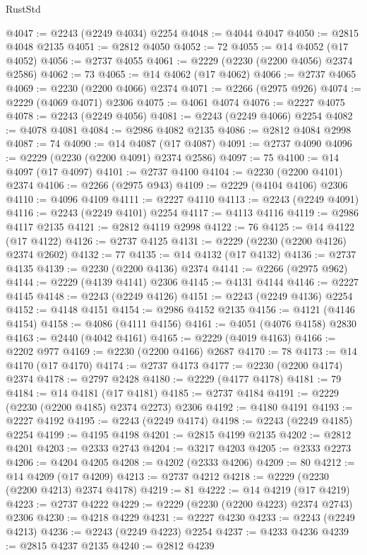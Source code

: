 \begin{lexlean}{RustStd}
\begin{coremodule}
@4047 := @2243 (@2249 @4034) @2254
@4048 := @4044 @4047
@4050 := @2815 @4048 @2135
@4051 := @2812 @4050
@4052 := 72
@4055 := @14 @4052 (@17 @4052)
@4056 := @2737 @4055
@4061 := @2229 (@2230 (@2200 @4056) @2374 @2586)
@4062 := 73
@4065 := @14 @4062 (@17 @4062)
@4066 := @2737 @4065
@4069 := @2230 (@2200 @4066) @2374
@4071 := @2266 (@2975 @926)
@4074 := @2229 (@4069 @4071) @2306
@4075 := @4061 @4074
@4076 := @2227 @4075
@4078 := @2243 (@2249 @4056)
@4081 := @2243 (@2249 @4066) @2254
@4082 := @4078 @4081
@4084 := @2986 @4082 @2135
@4086 := @2812 @4084 @2998
@4087 := 74
@4090 := @14 @4087 (@17 @4087)
@4091 := @2737 @4090
@4096 := @2229 (@2230 (@2200 @4091) @2374 @2586)
@4097 := 75
@4100 := @14 @4097 (@17 @4097)
@4101 := @2737 @4100
@4104 := @2230 (@2200 @4101) @2374
@4106 := @2266 (@2975 @943)
@4109 := @2229 (@4104 @4106) @2306
@4110 := @4096 @4109
@4111 := @2227 @4110
@4113 := @2243 (@2249 @4091)
@4116 := @2243 (@2249 @4101) @2254
@4117 := @4113 @4116
@4119 := @2986 @4117 @2135
@4121 := @2812 @4119 @2998
@4122 := 76
@4125 := @14 @4122 (@17 @4122)
@4126 := @2737 @4125
@4131 := @2229 (@2230 (@2200 @4126) @2374 @2602)
@4132 := 77
@4135 := @14 @4132 (@17 @4132)
@4136 := @2737 @4135
@4139 := @2230 (@2200 @4136) @2374
@4141 := @2266 (@2975 @962)
@4144 := @2229 (@4139 @4141) @2306
@4145 := @4131 @4144
@4146 := @2227 @4145
@4148 := @2243 (@2249 @4126)
@4151 := @2243 (@2249 @4136) @2254
@4152 := @4148 @4151
@4154 := @2986 @4152 @2135
@4156 := @4121 (@4146 @4154)
@4158 := @4086 (@4111 @4156)
@4161 := @4051 (@4076 @4158) @2830
@4163 := @2440 (@4042 @4161)
@4165 := @2229 (@4019 @4163)
@4166 := @2202 @977
@4169 := @2230 (@2200 @4166) @2687
@4170 := 78
@4173 := @14 @4170 (@17 @4170)
@4174 := @2737 @4173
@4177 := @2230 (@2200 @4174) @2374
@4178 := @2797 @2428
@4180 := @2229 (@4177 @4178)
@4181 := 79
@4184 := @14 @4181 (@17 @4181)
@4185 := @2737 @4184
@4191 := @2229 (@2230 (@2200 @4185) @2374 @2273) @2306
@4192 := @4180 @4191
@4193 := @2227 @4192
@4195 := @2243 (@2249 @4174)
@4198 := @2243 (@2249 @4185) @2254
@4199 := @4195 @4198
@4201 := @2815 @4199 @2135
@4202 := @2812 @4201
@4203 := @2333 @2743
@4204 := @3217 @4203
@4205 := @2333 @2273
@4206 := @4204 @4205
@4208 := @4202 (@2333 @4206)
@4209 := 80
@4212 := @14 @4209 (@17 @4209)
@4213 := @2737 @4212
@4218 := @2229 (@2230 (@2200 @4213) @2374 @4178)
@4219 := 81
@4222 := @14 @4219 (@17 @4219)
@4223 := @2737 @4222
@4229 := @2229 (@2230 (@2200 @4223) @2374 @2743) @2306
@4230 := @4218 @4229
@4231 := @2227 @4230
@4233 := @2243 (@2249 @4213)
@4236 := @2243 (@2249 @4223) @2254
@4237 := @4233 @4236
@4239 := @2815 @4237 @2135
@4240 := @2812 @4239

\end{coremodule}
\end{lexlean}
